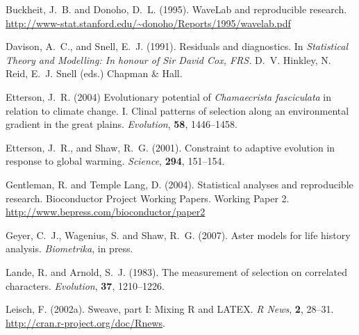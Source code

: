 \documentclass[11pt,twoside,notitlepage]{report}
\begin{document}
  \thispagestyle{empty}
  \cleardoublepage
  \setcounter{page}{1}







\begin{thebibliography}{}

Buckheit, J.~B. and Donoho, D.~L. (1995).
\newblock WaveLab and reproducible research.
\newblock \url{http://www-stat.stanford.edu/~donoho/Reports/1995/wavelab.pdf}

Davison, A.~C., and Snell, E.~J. (1991).
\newblock Residuals and diagnostics.
\newblock In \emph{Statistical Theory and Modelling: In honour
    of Sir David Cox, FRS\@.}  D.~V. Hinkley, N. Reid, E.~J. Snell (eds.)
\newblock Chapman \& Hall.

Etterson, J.~R. (2004)
\newblock Evolutionary potential of \emph{Chamaecrista fasciculata} in
    relation to climate change.  I. Clinal patterns of selection along
    an environmental gradient in the great plains.
\newblock \emph{Evolution}, \textbf{58}, 1446--1458.

Etterson, J.~R., and Shaw, R.~G. (2001).
\newblock Constraint to adaptive evolution in response to global warming.
\newblock \emph{Science}, \textbf{294}, 151--154.

Gentleman, R. and Temple Lang, D. (2004).
\newblock Statistical analyses and reproducible research.
\newblock Bioconductor Project Working Papers. Working Paper 2.
\newblock \url{http://www.bepress.com/bioconductor/paper2}


Geyer, C.~J., Wagenius, S. and Shaw, R.~G. (2007).
\newblock Aster models for life history analysis.
\newblock \emph{Biometrika}, in press.

Lande, R. and Arnold, S.~J. (1983).
\newblock The measurement of selection on correlated characters.
\newblock \emph{Evolution}, \textbf{37}, 1210--1226.

Leisch, F. (2002a).
\newblock Sweave, part I: Mixing R and LATEX.
\newblock \emph{R News}, \textbf{2}, 28--31.
\newblock \url{http://cran.r-project.org/doc/Rnews}.


\end{thebibliography}
\end{document}
